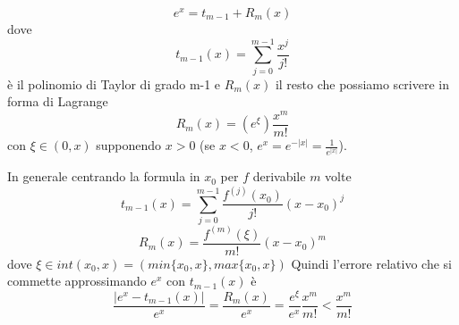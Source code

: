 \documentclass[12pt]{article}
\begin{document}
\begin{equation*}
    e^x=t_{m-1}+R_m(x)
\end{equation*}
dove 
\begin{equation*}
    t_{m-1}(x)=\sum_{j=0}^{m-1}\frac{x^j}{j!}
\end{equation*}
è il polinomio di Taylor di grado m-1 e $R_m(x)$ il resto che possiamo scrivere in forma di Lagrange
\begin{equation*}
    R_m(x)=(e^{\xi})\frac{x^m}{m!}
\end{equation*}
con $\xi\in(0,x) $ supponendo $x>0$ (se $x<0$, $e^x=e^{-|x|}=\frac{1}{e^{|x|}}$).\\

\begin{flushleft}
In generale centrando la formula in $x_0$ per $f$ derivabile $m$ volte
\begin{equation*}
t_{m-1}\left(x\right)=\sum_{j=0}^{m-1}\frac{f^{\left( j\right)}\left(x_0\right)}{j!}\left(x-x_0\right)^j
\end{equation*}
\begin{equation*}
R_m\left(x\right)=\frac{f^{\left(m\right)}\left(\xi\right)}{m!}\left(x-x_0\right)^m
\end{equation*}
dove $\xi\in int\left(x_0,x\right)=\left(min\{x_0,x\},max\{x_0,x\}\right)$
Quindi l'errore relativo che si commette approssimando $e^x$ con $t_{m-1}\left(x\right)$ è
\begin{equation*}
\frac{|e^x-t_{m-1}\left(x\right)|}{e^x}=\frac{R_m\left(x\right)}{e^x}=\frac{e^\xi}{e^x}\frac{x^m}{m!}
<\frac{x^m}{m!}    
\end{equation*}
\end{flushleft}
\end{document}
